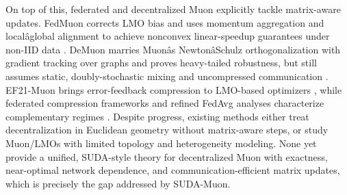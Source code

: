 \documentclass[11pt]{article}
\begin{document}
On top of this, federated and decentralized Muon explicitly tackle matrix-aware updates. FedMuon corrects LMO bias and uses momentum aggregation and localâglobal alignment to achieve nonconvex linear-speedup guarantees under non-IID data \citep{Takezawa2025FedMuonFL, liu2025fedmuon}. DeMuon marries Muonâs NewtonâSchulz orthogonalization with gradient tracking over graphs and proves heavy-tailed robustness, but still assumes static, doubly-stochastic mixing and uncompressed communication \citep{he2025demuon}. EF21-Muon brings error-feedback compression to LMO-based optimizers \citep{Gruntkowska2025ErrorFF}, while federated compression frameworks and refined FedAvg analyses characterize complementary regimes \citep{Haddadpour2020FederatedLW, su2023non, li2019convergence, Renggli2018SparCMLHS}. Despite progress, existing methods either treat decentralization in Euclidean geometry without matrix-aware steps, or study Muon/LMOs with limited topology and heterogeneity modeling. None yet provide a unified, SUDA-style theory for decentralized Muon with exactness, near-optimal network dependence, and communication-efficient matrix updates, which is precisely the gap addressed by SUDA-Muon.



\end{document}
